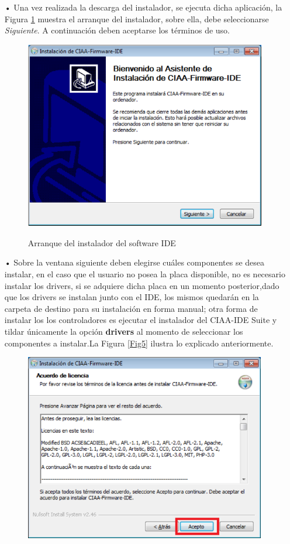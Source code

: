\documentclass[12pt,letterpaper]{article}
\begin{document}
\begin{enumerate}
\item[•]Una vez realizada la descarga del instalador, se ejecuta dicha aplicación, la Figura \ref{Fig4} muestra el arranque del instalador, sobre ella, debe seleccionarse \textit{Siguiente}. A continuación deben aceptarse los términos de uso.
\begin{figure}[H]
\centering
\includegraphics[width=8 cm]{figuras/instalacion1.png}\\
\caption{Arranque del instalador del software IDE}
\label{Fig4}
\end{figure}
\item[•]Sobre la ventana siguiente deben elegirse cuáles componentes se desea instalar, en el caso que el usuario no posea  la placa disponible, no es necesario instalar los drivers, si se adquiere dicha placa en un momento posterior,dado que los drivers se instalan junto con el IDE, los mismos quedarán en la carpeta de destino para su instalación en forma manual; otra forma de instalar los  los controladores es ejecutar el instalador del CIAA-IDE Suite y tildar únicamente la opción \textbf{drivers} al momento de seleccionar los componentes a instalar.La Figura \ref{Fig5} ilustra lo explicado anteriormente.
\begin{figure}[!h]
\centering
\includegraphics[width=8 cm]{figuras/instalacion2.png}\\

\end{figure}
\end{enumerate}
\end{document}
